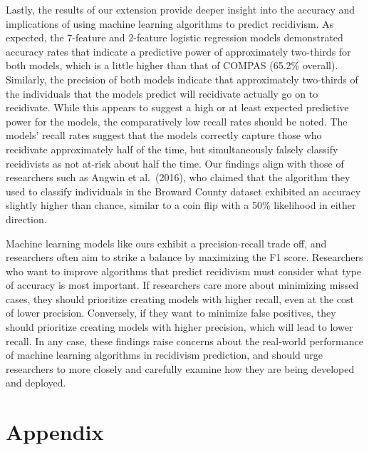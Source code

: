 \documentclass[12pt, ]{article}
\newenvironment{CSLReferences}[2]{

\clearpage
}{}
\begin{document}
Lastly, the results of our extension provide deeper insight into the
accuracy and implications of using machine learning algorithms to
predict recidivism. As expected, the 7-feature and 2-feature logistic
regression models demonstrated accuracy rates that indicate a predictive
power of approximately two-thirds for both models, which is a little
higher than that of COMPAS (65.2\% overall). Similarly, the precision of
both models indicate that approximately two-thirds of the individuals
that the models predict will recidivate actually go on to recidivate.
While this appears to suggest a high or at least expected predictive
power for the models, the comparatively low recall rates should be
noted. The models' recall rates suggest that the models correctly
capture those who recidivate approximately half of the time, but
simultaneously falsely classify recidivists as not at-risk about half
the time. Our findings align with those of researchers such as Angwin et
al.~(2016), who claimed that the algorithm they used to classify
individuals in the Broward County dataset exhibited an accuracy slightly
higher than chance, similar to a coin flip with a 50\% likelihood in
either direction.

Machine learning models like ours exhibit a precision-recall trade off,
and researchers often aim to strike a balance by maximizing the F1
score. Researchers who want to improve algorithms that predict
recidivism must consider what type of accuracy is most important. If
researchers care more about minimizing missed cases, they should
prioritize creating models with higher recall, even at the cost of lower
precision. Conversely, if they want to minimize false positives, they
should prioritize creating models with higher precision, which will lead
to lower recall. In any case, these findings raise concerns about the
real-world performance of machine learning algorithms in recidivism
prediction, and should urge researchers to more closely and carefully
examine how they are being developed and deployed.

\hypertarget{refs}{}

\begin{CSLReferences}{0}{0}\end{CSLReferences}

\appendix

\hypertarget{appendix}{%
\section{Appendix}\label{appendix}}
\end{document}
